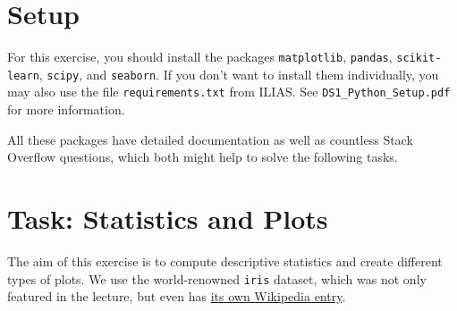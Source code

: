 \documentclass[12pt]{article}
\newcommand{\code}[1]{\textcolor{kitgreen}{\texttt{#1}}}
\begin{document}
\section*{Setup}

For this exercise, you should install the packages \code{matplotlib}, \code{pandas}, \code{scikit-learn}, \code{scipy}, and \code{seaborn}.
If you don't want to install them individually, you may also use the file \code{requirements.txt} from ILIAS.
See \code{DS1\_Python\_Setup.pdf} for more information.

All these packages have detailed documentation as well as countless Stack Overflow questions, which both might help to solve the following tasks.

\section*{Task: Statistics and Plots}

The aim of this exercise is to compute descriptive statistics and create different types of plots.
We use the world-renowned \code{iris} dataset, which was not only featured in the lecture, but even has \href{https://en.wikipedia.org/wiki/Iris_flower_data_set}{its own Wikipedia entry}.
\end{document}
